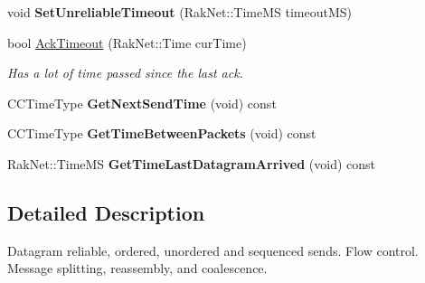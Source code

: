 \begin{DoxyCompactItemize}
\item 
\hypertarget{class_rak_net_1_1_reliability_layer_a811d61b8474830e4087a39e84d72f928}{void {\bfseries Set\-Unreliable\-Timeout} (Rak\-Net\-::\-Time\-M\-S timeout\-M\-S)}\label{class_rak_net_1_1_reliability_layer_a811d61b8474830e4087a39e84d72f928}

\item 
\hypertarget{class_rak_net_1_1_reliability_layer_a97ed79b752b105253bae9f41b27084b6}{bool \hyperlink{class_rak_net_1_1_reliability_layer_a97ed79b752b105253bae9f41b27084b6}{Ack\-Timeout} (Rak\-Net\-::\-Time cur\-Time)}\label{class_rak_net_1_1_reliability_layer_a97ed79b752b105253bae9f41b27084b6}

\begin{DoxyCompactList}\small\item\em Has a lot of time passed since the last ack. \end{DoxyCompactList}\item 
\hypertarget{class_rak_net_1_1_reliability_layer_add29e3317a025e57db1808fb3135f964}{C\-C\-Time\-Type {\bfseries Get\-Next\-Send\-Time} (void) const }\label{class_rak_net_1_1_reliability_layer_add29e3317a025e57db1808fb3135f964}

\item 
\hypertarget{class_rak_net_1_1_reliability_layer_a5db5f50a831b367428e5685faead5aa4}{C\-C\-Time\-Type {\bfseries Get\-Time\-Between\-Packets} (void) const }\label{class_rak_net_1_1_reliability_layer_a5db5f50a831b367428e5685faead5aa4}

\item 
\hypertarget{class_rak_net_1_1_reliability_layer_a8e99f221877f6048a4c8fa53784039c2}{Rak\-Net\-::\-Time\-M\-S {\bfseries Get\-Time\-Last\-Datagram\-Arrived} (void) const }\label{class_rak_net_1_1_reliability_layer_a8e99f221877f6048a4c8fa53784039c2}

\end{DoxyCompactItemize}


\subsection{Detailed Description}
Datagram reliable, ordered, unordered and sequenced sends. Flow control. Message splitting, reassembly, and coalescence. 

